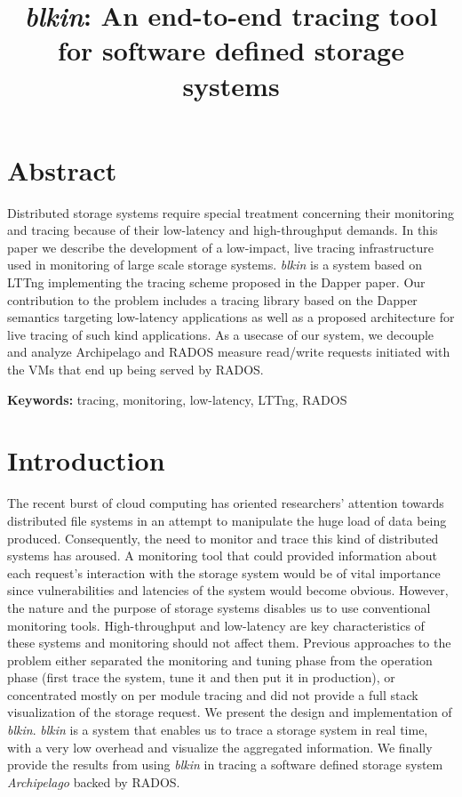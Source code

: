 \documentclass[a4paper,12pt]{article}
\begin{document}
\title{\emph{blkin}: An end-to-end tracing tool for software defined storage 
systems}
\date{}
\maketitle

\section*{Abstract}
Distributed storage systems require special treatment concerning their 
monitoring and tracing because of their low-latency and high-throughput demands.
In this paper we describe the development of a low-impact, live tracing 
infrastructure used in monitoring of large scale storage systems. \emph{blkin}
is a system based on LTTng\cite{lttng} implementing the tracing scheme proposed
in the Dapper paper\cite{dapper}. Our contribution to the problem includes a 
tracing library based on the Dapper semantics targeting low-latency applications
as well as a proposed architecture for live tracing of such kind applications.
As a usecase of our system, we decouple and analyze Archipelago\cite{archip} and
RADOS\cite{rados} measure read/write requests initiated with the VMs that end up
being served by RADOS.


\textbf{Keywords: } tracing, monitoring, low-latency, LTTng, RADOS

\section{Introduction}
The recent burst of cloud computing has oriented researchers' attention towards
distributed file systems in an attempt to manipulate the huge load of data being
produced. Consequently, the need to monitor and trace this kind of distributed 
systems has aroused. A monitoring tool that could provided information about
each request's interaction with the storage system would be of vital importance
since vulnerabilities and latencies of the system would become obvious. However,
the nature and the purpose of storage systems disables us to use conventional 
monitoring tools. High-throughput and low-latency are key characteristics of 
these systems and monitoring should not affect them. Previous approaches to the
problem either separated the monitoring and tuning phase from the operation 
phase (first trace the system, tune it and then put it in production), or
concentrated mostly on per module tracing and did not provide a full stack 
visualization of the storage request. We present the design and implementation
of \emph{blkin}. \emph{blkin} is a system that enables us to trace a storage 
system in real time, with a very low overhead and visualize the aggregated 
information. We finally provide the results from using \emph{blkin} in tracing
a software defined storage system \emph{Archipelago}\cite{archip} backed by
RADOS\cite{rados}.
\end{document}
